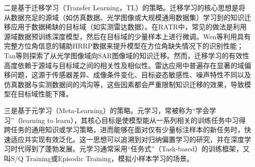 二是基于迁移学习（Transfer Learning，TL）的策略。迁移学习的核心思想是将从数据充足的源域（如仿真数据、光学图像或大规模通用数据集）学习到的知识迁移应用于数据稀缺的目标域（如实测雷达数据）。在RATR中，常见的做法是利用源域数据预训练深度模型，然后在目标域的少量样本上进行微调。Wen等利用具有完整方位角信息的辅助HRRP数据来提升模型在方位角缺失情况下的识别性能；Tan等则探索了从光学图像域向SAR图像域的知识迁移。然而，迁移学习的有效性高度依赖于源域与目标域之间的相关性及相似性。雷达应用中普遍存在显著的域偏移问题，这源于传感器差异、成像条件变化、目标姿态敏感性、噪声特性不同以及仿真数据与实测数据间的鸿沟等，这些因素都会严重限制知识迁移的效果，导致模型在目标域性能下降。

三是基于元学习（Meta-Learning）的策略。元学习，常被称为“学会学习”（learning to learn），其核心目标是使模型能从一系列相关的训练任务中习得跨任务的通用知识或学习策略，进而能够在面对仅有少量标注样本的新任务时，快速适应并实现有效泛化。这一思想可以追溯到对归纳偏置学习的研究，并在深度学习时代得到了蓬勃发展。元学习通常采用“任务式”（Task-based）的训练框架，又叫S/Q Training或Episodic Training，模拟小样本学习的场景。

